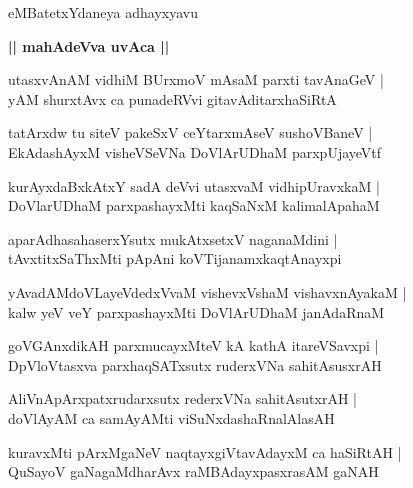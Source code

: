 \documentclass[twoside,12pt,openright]{book}
\newcounter{shloka}[chapter]
\def\uvaca#1{\centerline{{\large\textbf{#1}}}}
\begin{document}
\begin{center}
eMBatetxYdaneya adhayxyavu
\end{center}

\uvaca{|| mahAdeVva uvAca ||}

\begin{shloka}%
utasxvAnAM vidhiM BUrxmoV mAsaM parxti tavAnaGeV |\\
yAM shurxtAvx ca punadeRVvi gitavAditarxhaSiRtA
\end{shloka}

\begin{shloka}%
tatArxdw tu siteV pakeSxV ceYtarxmAseV sushoVBaneV |\\
EkAdashAyxM visheVSeVNa DoVlArUDhaM parxpUjayeVtf
\end{shloka}

\begin{shloka}%
kurAyxdaBxkAtxY sadA deVvi utasxvaM vidhipUravxkaM |\\
DoVlarUDhaM parxpashayxMti kaqSaNxM kalimalApahaM 
\end{shloka}

\begin{shloka}%
aparAdhasahaserxYsutx mukAtxsetxV naganaMdini |\\
tAvxtitxSaThxMti pApAni koVTijanamxkaqtAnayxpi
\end{shloka}

\begin{shloka}%
yAvadAMdoVLayeVdedxVvaM vishevxVshaM vishavxnAyakaM |\\
kalw yeV veY parxpashayxMti DoVlArUDhaM janAdaRnaM
\end{shloka}

\begin{shloka}%
goVGAnxdikAH parxmucayxMteV kA kathA itareVSavxpi |\\
DpVloVtasxva parxhaqSATxsutx ruderxVNa sahitAsusxrAH 
\end{shloka}

\begin{shloka}%
AliVnApArxpatxrudarxsutx rederxVNa sahitAsutxrAH |\\
doVlAyAM ca samAyAMti viSuNxdashaRnalAlasAH 
\end{shloka}

\begin{shloka}%
kuravxMti pArxMgaNeV naqtayxgiVtavAdayxM ca haSiRtAH |\\
QuSayoV gaNagaMdharAvx raMBAdayxpasxrasAM gaNAH 
\end{shloka}
\end{document}
